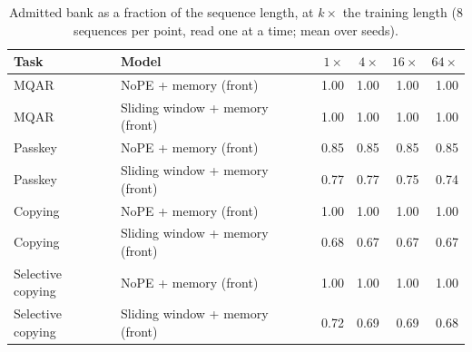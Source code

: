 \begin{table}\centering\small
\begin{tabular}{llrrrr}
\toprule
Task & Model & $1\times$ & $4\times$ & $16\times$ & $64\times$ \\
\midrule
MQAR & NoPE + memory (front) & 1.00 & 1.00 & 1.00 & 1.00 \\
MQAR & Sliding window + memory (front) & 1.00 & 1.00 & 1.00 & 1.00 \\
Passkey & NoPE + memory (front) & 0.85 & 0.85 & 0.85 & 0.85 \\
Passkey & Sliding window + memory (front) & 0.77 & 0.77 & 0.75 & 0.74 \\
Copying & NoPE + memory (front) & 1.00 & 1.00 & 1.00 & 1.00 \\
Copying & Sliding window + memory (front) & 0.68 & 0.67 & 0.67 & 0.67 \\
Selective copying & NoPE + memory (front) & 1.00 & 1.00 & 1.00 & 1.00 \\
Selective copying & Sliding window + memory (front) & 0.72 & 0.69 & 0.69 & 0.68 \\
\bottomrule
\end{tabular}
\caption{Admitted bank as a fraction of the sequence length, at $k\times$ the training length (8 sequences per point, read one at a time; mean over seeds).}
\label{tab:bank}
\end{table}

